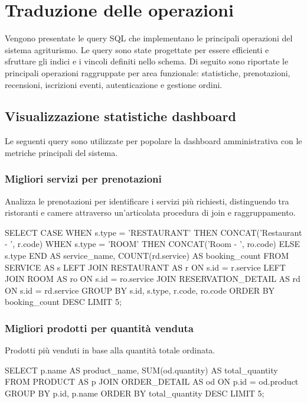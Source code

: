 \documentclass[a4paper,12pt]{report}
\begin{document}
\section{Traduzione delle operazioni}
Vengono presentate le query SQL che implementano le
principali operazioni del sistema agriturismo. Le query sono state
progettate per essere efficienti e sfruttare gli indici e i vincoli
definiti nello schema. Di seguito sono riportate le principali operazioni
raggruppate per area funzionale: statistiche, prenotazioni, recensioni,
iscrizioni eventi, autenticazione e gestione ordini.

\subsection{Visualizzazione statistiche dashboard}
Le seguenti query sono utilizzate per popolare la dashboard
amministrativa con le metriche principali del sistema.

\subsubsection{Migliori servizi per prenotazioni}
Analizza le prenotazioni per identificare i servizi più richiesti,
distinguendo tra ristoranti e camere attraverso un'articolata
procedura di join e raggruppamento.

\begin{sqlcode}[caption={}]
SELECT CASE
    WHEN s.type = 'RESTAURANT' THEN CONCAT('Restaurant - ', r.code)
    WHEN s.type = 'ROOM' THEN CONCAT('Room - ', ro.code)
    ELSE s.type
  END AS service_name,
  COUNT(rd.service) AS booking_count
FROM SERVICE AS s
LEFT JOIN RESTAURANT AS r ON s.id = r.service
LEFT JOIN ROOM AS ro ON s.id = ro.service
JOIN RESERVATION_DETAIL AS rd ON s.id = rd.service
GROUP BY s.id, s.type, r.code, ro.code
ORDER BY booking_count DESC
LIMIT 5;
\end{sqlcode}

\subsubsection{Migliori prodotti per quantità venduta}
Prodotti più venduti in base alla quantità totale ordinata.

\begin{sqlcode}[caption={}]
SELECT
  p.name AS product_name,
  SUM(od.quantity) AS total_quantity
FROM PRODUCT AS p
JOIN ORDER_DETAIL AS od ON p.id = od.product
GROUP BY p.id, p.name
ORDER BY total_quantity DESC
LIMIT 5;
\end{sqlcode}
\end{document}
